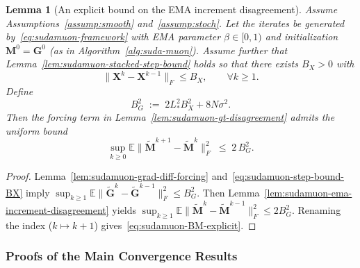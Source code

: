 \documentclass{article}
\newtheorem{lemma}{Lemma}
\begin{document}
\begin{lemma}[An explicit bound on the EMA increment disagreement]
\label{lem:sudamuon-ema-increment-disagreement-explicit}
Assume Assumptions~\ref{assump:smooth} and~\ref{assump:stoch}.
Let the iterates be generated by~\eqref{eq:sudamuon-framework} with EMA parameter $\beta\in[0,1)$ and initialization $\mathbf M^0=\mathbf G^0$ (as in Algorithm~\ref{alg:suda-muon}).
Assume further that Lemma~\ref{lem:sudamuon-stacked-step-bound} holds so that there exists $B_X>0$ with
\begin{equation}
\label{eq:sudamuon-step-bound-BX}
\|\mathbf X^{k}-\mathbf X^{k-1}\|_F\le B_X,\qquad \forall k\ge 1.
\end{equation}
Define
\begin{equation}
\label{eq:sudamuon-BG-def}
B_G^2 \;:=\; 2L_*^2 B_X^2 + 8N\sigma^2.
\end{equation}
Then the forcing term in Lemma~\ref{lem:sudamuon-gt-disagreement} admits the uniform bound
\begin{equation}
\label{eq:sudamuon-BM-explicit}
\sup_{k\ge 0}\mathbb{E}\|\tilde{\mathbf M}^{k+1}-\tilde{\mathbf M}^{k}\|_F^2
\;\le\; 2\,B_G^2.
\end{equation}
\end{lemma}
\begin{proof}
Lemma~\ref{lem:sudamuon-grad-diff-forcing} and~\eqref{eq:sudamuon-step-bound-BX} imply
$\sup_{k\ge 1}\mathbb{E}\|\tilde{\mathbf G}^{k}-\tilde{\mathbf G}^{k-1}\|_F^2\le B_G^2$.
Then Lemma~\ref{lem:sudamuon-ema-increment-disagreement} yields
$\sup_{k\ge 1}\mathbb{E}\|\tilde{\mathbf M}^{k}-\tilde{\mathbf M}^{k-1}\|_F^2\le 2B_G^2$.
Renaming the index ($k\mapsto k+1$) gives~\eqref{eq:sudamuon-BM-explicit}.
\end{proof}

\subsubsection*{Proofs of the Main Convergence Results}
\end{document}
